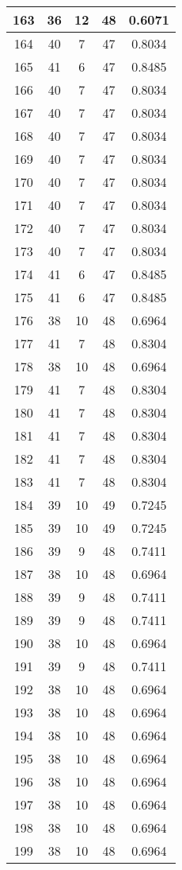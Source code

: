 \documentclass[letterpaper, 12pt]{article}
\begin{document}
\begin{longtable}{|c|c|c|c|c|}
\hline
163 & 36 & 12 & 48 & 0.6071 \\
\hline
164 & 40 & 7 & 47 & 0.8034 \\
\hline
165 & 41 & 6 & 47 & 0.8485 \\
\hline
166 & 40 & 7 & 47 & 0.8034 \\
\hline
167 & 40 & 7 & 47 & 0.8034 \\
\hline
168 & 40 & 7 & 47 & 0.8034 \\
\hline
169 & 40 & 7 & 47 & 0.8034 \\
\hline
170 & 40 & 7 & 47 & 0.8034 \\
\hline
171 & 40 & 7 & 47 & 0.8034 \\
\hline
172 & 40 & 7 & 47 & 0.8034 \\
\hline
173 & 40 & 7 & 47 & 0.8034 \\
\hline
174 & 41 & 6 & 47 & 0.8485 \\
\hline
175 & 41 & 6 & 47 & 0.8485 \\
\hline
176 & 38 & 10 & 48 & 0.6964 \\
\hline
177 & 41 & 7 & 48 & 0.8304 \\
\hline
178 & 38 & 10 & 48 & 0.6964 \\
\hline
179 & 41 & 7 & 48 & 0.8304 \\
\hline
180 & 41 & 7 & 48 & 0.8304 \\
\hline
181 & 41 & 7 & 48 & 0.8304 \\
\hline
182 & 41 & 7 & 48 & 0.8304 \\
\hline
183 & 41 & 7 & 48 & 0.8304 \\
\hline
184 & 39 & 10 & 49 & 0.7245 \\
\hline
185 & 39 & 10 & 49 & 0.7245 \\
\hline
186 & 39 & 9 & 48 & 0.7411 \\
\hline
187 & 38 & 10 & 48 & 0.6964 \\
\hline
188 & 39 & 9 & 48 & 0.7411 \\
\hline
189 & 39 & 9 & 48 & 0.7411 \\
\hline
190 & 38 & 10 & 48 & 0.6964 \\
\hline
191 & 39 & 9 & 48 & 0.7411 \\
\hline
192 & 38 & 10 & 48 & 0.6964 \\
\hline
193 & 38 & 10 & 48 & 0.6964 \\
\hline
194 & 38 & 10 & 48 & 0.6964 \\
\hline
195 & 38 & 10 & 48 & 0.6964 \\
\hline
196 & 38 & 10 & 48 & 0.6964 \\
\hline
197 & 38 & 10 & 48 & 0.6964 \\
\hline
198 & 38 & 10 & 48 & 0.6964 \\
\hline
199 & 38 & 10 & 48 & 0.6964 \\
\hline
\end{longtable}
\end{document}
